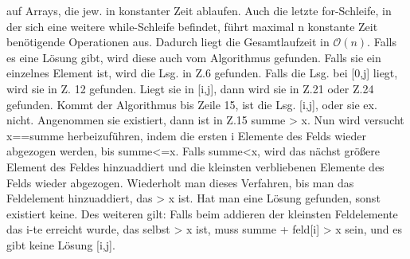 \documentclass[a4paper,10pt,oneside,leqno]{scrartcl}
\begin{document}
auf Arrays, die jew. in konstanter Zeit ablaufen. Auch die letzte for-Schleife, in der sich eine weitere while-Schleife befindet, führt maximal n
konstante Zeit benötigende Operationen aus. Dadurch liegt die Gesamtlaufzeit in $\mathcal{O}(n)$.\newline
Falls es eine Lösung gibt, wird diese auch vom Algorithmus gefunden. Falls sie ein einzelnes Element ist, wird die Lsg. in Z.6 gefunden.
Falls die Lsg. bei [0,j] liegt, wird sie in Z. 12 gefunden. Liegt sie in [i,j], dann wird sie in Z.21 oder Z.24 gefunden. Kommt der Algorithmus
bis Zeile 15, ist die Lsg. [i,j], oder sie ex. nicht. Angenommen sie existiert, dann ist in Z.15 summe > x. Nun wird versucht x==summe
herbeizuführen, indem die ersten i Elemente des Felds wieder abgezogen werden, bis summe<=x. Falls summe<x, wird das nächst größere Element
des Feldes hinzuaddiert und die kleinsten verbliebenen Elemente des Felds wieder abgezogen. Wiederholt man dieses Verfahren, bis man das
Feldelement hinzuaddiert, das > x ist. Hat man eine Lösung gefunden, sonst existiert keine. Des weiteren gilt: Falls beim addieren der 
kleinsten Feldelemente das i-te erreicht wurde, das selbst > x ist, muss summe + feld[i] > x sein, und es gibt keine Lösung [i,j].
\end{document}
